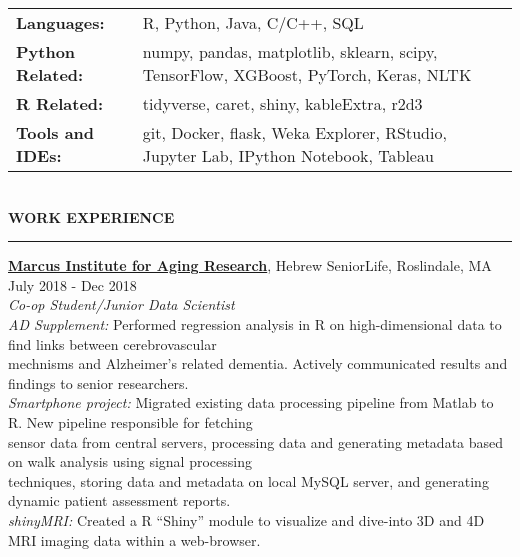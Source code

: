 \documentclass[a4paper]{article}
\newcommand{\myline}{\par
  \kern2pt %
  \hrule height 0.5pt
  \kern2pt %
}
\newcommand{\mybullet}{
	\indent \textbullet \hspace*{2mm}
}
\newcommand{\linetab}{
  \\ \hspace*{9mm}
}
\begin{document}
	\noindent
	\begin{tabular}{ m{3cm} l }
		\textbf{Languages: } & R, Python, Java, C/C++, SQL \\ 
    \textbf{Python Related: } & numpy, pandas, matplotlib, sklearn, scipy, TensorFlow, XGBoost, PyTorch, Keras, NLTK \\ 
    \textbf{R Related: } & tidyverse, caret, shiny, kableExtra, r2d3 \\
		\textbf{Tools and IDEs: } & git, Docker, flask, Weka Explorer, RStudio, 
                Jupyter Lab, IPython Notebook, Tableau \\
	\end{tabular} \\

	\smallskip
	\smallskip
	\noindent
	{\large \textbf{WORK EXPERIENCE}}
	\myline 
	\smallskip
	
  \noindent
  \textbf{\href{https://www.marcusinstituteforaging.org/}{Marcus Institute for Aging Research}}, 
  Hebrew SeniorLife, Roslindale, MA 
  \hfill July 2018 - Dec 2018 \\
        \textit{Co-op Student/Junior Data Scientist} \\
        \mybullet \textit{AD Supplement:} Performed regression analysis in R on high-dimensional 
        data to find links between cerebrovascular  \\ \hspace*{9mm} mechnisms 
        and Alzheimer's related dementia. Actively communicated results and findings to senior
        researchers. \\
        \mybullet \textit{Smartphone project:} Migrated existing data processing pipeline from 
        Matlab to R. New pipeline responsible for fetching \linetab sensor data from 
        central servers, processing data and generating metadata based on walk analysis 
        using signal processing \linetab techniques, storing data and metadata on local 
        MySQL server, and generating dynamic patient assessment reports. \\
        \mybullet \textit{shinyMRI: } Created a R ``Shiny'' module to visualize and 
        dive-into 3D and 4D MRI imaging data within a web-browser. \\
        
	
\end{document}
